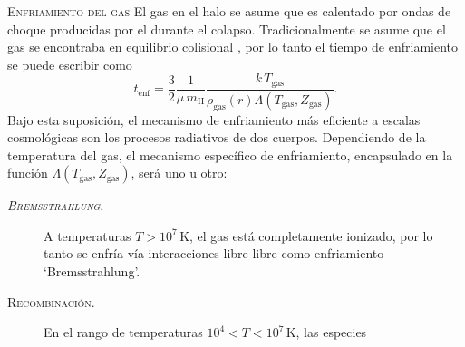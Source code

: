 \documentclass[xcolor=dvipsnames,4pt,hyperref={colorlinks,citecolor=black,linkcolor=black,urlcolor=black}]{beamer}
\begin{document}
\begin{frame}[allowframebreaks]{\textsc{Enfriamiento del gas}}
%
%
El gas en el halo se asume que es calentado por ondas de choque producidas por el durante el
colapso. Tradicionalmente se asume que el gas se encontraba en equilibrio colisional \citep[sin
embargo véase][]{Wiersma2009a}, por lo tanto el tiempo de enfriamiento se puede escribir como
%
$$
t_\text{enf} = \frac{3}{2}\frac{1}{\mu\,m_\text{H}}\frac{k\,T_\text{gas}}{\rho_\text{gas}(r)\Lambda(T_\text{gas}, Z_\text{gas})}.
$$
%
Bajo esta suposición, el mecanismo de enfriamiento más eficiente a escalas cosmológicas son los
procesos radiativos de dos cuerpos. Dependiendo de la temperatura del gas, el mecanismo específico
de enfriamiento, encapsulado en la función $\Lambda(T_\text{gas}, Z_\text{gas})$, será uno u otro:
%
\begin{description}
%
\item[\textsc{\emph{Bremsstrahlung}.}] A temperaturas $T>10^7\,$K, el gas está completamente
ionizado, por lo tanto se enfría vía interacciones libre-libre como enfriamiento `Bremsstrahlung'.
\item[\textsc{Recombinación.}] En el rango de temperaturas $10^4<T<10^7\,$K, las especies

\end{description}
\end{frame}
\end{document}
